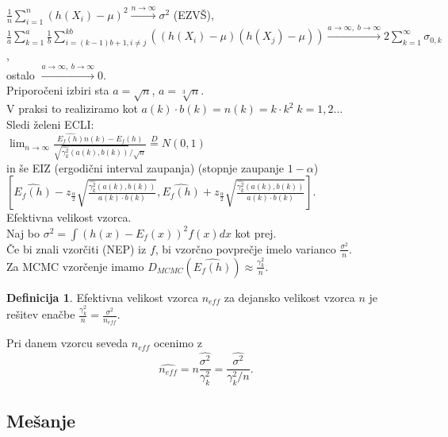 \documentclass[a4paper, 12pt]{book}
\theoremstyle{definition}
\newtheorem{defn}[counter]{Definicija}
\theoremstyle{remark}
\begin{document}
$\frac{1}{n} \sum_{i=1}^{n} (h(X_i) - \mu)^2 \stackrel{n \to \infty}{\longrightarrow} \sigma^2$ (EZVŠ), \\
$\frac{1}{a} \sum_{k=1}^{a} \frac{1}{b} \sum_{i=(k-1)b+1, i \neq j}^{kb} ((h(X_i) - \mu) (h(X_j) - \mu))
\stackrel{a \to \infty, \; b \to \infty}{\longrightarrow} 2 \sum_{k=1}^{\infty} \sigma_{0,k}$, \\
ostalo $\stackrel{a \to \infty, \; b \to \infty}{\longrightarrow} 0$. \\
Priporočeni izbiri sta $a = \sqrt{n}$, $a = \sqrt[3]{n}$. \\
V praksi to realiziramo kot $a(k) \cdot b(k) = n(k) = k \cdot k^2 \; k = 1, 2 \dots$ \\
Sledi želeni ECLI: \\
$\lim_{n \to \infty} \frac{\widehat{E_f(h)} n(k) - E_f(h)}{\sqrt{\widehat{\gamma_k^2}(a(k),b(k))} / \sqrt{n}}
  \stackrel{D}{=} N(0,1)$ \\
in še EIZ (ergodični interval zaupanja) (stopnje zaupanje $1 - \alpha$) \\
$\left[\widehat{E_f(h)} - z_{\frac{\alpha}{2}} \sqrt{\frac{\widehat{\gamma_k^2}(a(k),b(k))}{a(k) \cdot b(k)}},
  \widehat{E_f(h)} + z_{\frac{\alpha}{2}} \sqrt{\frac{\widehat{\gamma_k^2}(a(k),b(k))}{a(k) \cdot b(k)}}
  \right]$. \\
Efektivna velikost vzorca. \\
Naj bo $\sigma^2 = \int (h(x) - E_f(x))^2 f(x) dx$ kot prej. \\
Če bi znali vzorčiti (NEP) iz $f$, bi vzorčno povprečje imelo varianco $\frac{\sigma^2}{n}$. \\
Za MCMC vzorčenje imamo $D_{MCMC}(\widehat{E_f(h)}) \approx \frac{\gamma_k^2}{n}$.
\begin{defn}
  Efektivna velikost vzorca $n_{eff}$ za dejansko velikost vzorca $n$ je rešitev enačbe
  $\frac{\gamma_k^2}{n} = \frac{\sigma^2}{n_{eff}}$. 
\end{defn}
Pri danem vzorcu seveda $n_{eff}$ ocenimo z
\begin{equation*}
  \widehat{n_{eff}} = n \frac{\widehat{\sigma^2}}{\gamma_k^2} = \frac{\widehat{\sigma^2}}{\gamma_k^2 / n}.
\end{equation*}

\subsection{Mešanje}
\end{document}

